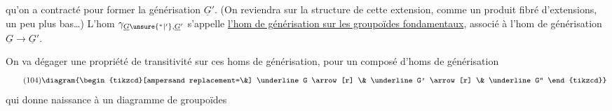 qu'on a contracté pour former la générisation $\underline G'$.  (On reviendra sur la structure de cette extension, comme un produit fibré d'extensions, un peu plus bas\ldots) L'hom $\gamma_{\underline G\unsure{{}^*|{}'},\underline G'}$ s'appelle \uline{l'hom de générisation sur les groupoïdes fondamentaux}, associé à l'hom de générisation $\underline G\to\underline G'$.

On va dégager une propriété de transitivité sur ces homs de générisation, pour un composé d'homs de générisation
\[
\tag{104}
\diagram{\begin{tikzcd}[ampersand replacement=\&]
\underline G \arrow[r] \& \underline G' \arrow[r] \& \underline G''
\end{tikzcd}}
\]
qui donne naissance à un diagramme de groupoïdes
